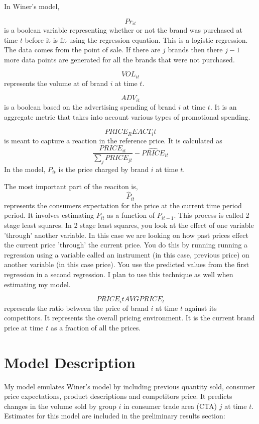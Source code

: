 \documentclass{article}
\begin{document}
In Winer's model,

$${Pr}_{it}$$ is a boolean variable representing whether or not the brand was purchased at time $t$ before it is fit using the regression equation. This is a logistic regression. The data comes from the point of sale. If there are $j$ brands then there $j-1$ more data points are generated for all the brands that were not purchased.

$$VOL_{it}$$ represents the volume at of brand $i$ at time $t$.

$$ADV_{it}$$ is a boolean based on the advertising spending of brand $i$ at time $t$. It is an aggregate metric that takes into account various types of promotional spending.

$$PRICE_REACT_it$$ is meant to capture a reaction in the reference price. It is calculated as $$\dfrac{PRICE_{it}} {\sum_j PRICE_{jt}} - \hat{PRICE}_{it}$$ In the model, $P_{it}$ is the price charged by brand $i$ at time $t$. 

The most important part of the reaciton is, $$\hat{P}_{it}$$ represents the consumers expectation for the price at the current time period period. It involves estimating ${P}_{it}$ as a function of ${P}_{it-1}$. This process is called 2 stage least squares. In 2 stage least squares, you look at the effect of one variable 'through' another variable.  In this case we are looking on how past prices effect the current price 'through' the current price. You do this by running running a regression using a variable called an instrument (in this case, previous price) on another variable (in this case price). You use the predicted values from the first regression in a second regression.  I plan to use this technique as well when estimating my model.

$$ {PRICE_it}{AVGPRICE_{t}}$$ represents the ratio between the price of brand $i$ at time $t$ against its competitors. It represents the overall pricing environment. It is the current brand price at time $t$ as a fraction of all the prices.

\section{Model Description}

My model emulates Winer's model by including previous quantity sold, consumer price expectations, product descriptions and competitors price. It predicts changes in the volume sold by group $i$ in consumer trade area (CTA) $j$ at time $t$. Estimates for this model are included in the preliminary results section:
\end{document}
